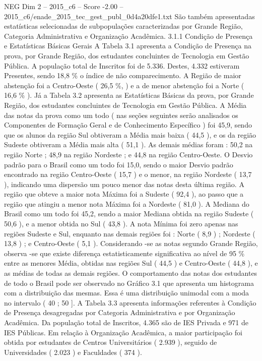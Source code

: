 \begin{textsample}{NEG Dim 2 – 2015\_c6 – Score -2.00 – 2015\_c6/enade\_2015\_tec\_gest\_publ\_0d4a20dfe1.txt}
São também apresentadas estatísticas selecionadas de subpopulações caracterizadas por Grande Região, Categoria Administrativa e Organização Acadêmica. 3.1.1 Condição de Presença e Estatísticas Básicas Gerais A Tabela 3.1 apresenta a Condição de Presença na prova, por Grande Região, dos estudantes concluintes de Tecnologia em Gestão Pública.
A população total de Inscritos foi de 5.336.
Destes, 4.332 estiveram Presentes, sendo 18,8 \% o índice de não comparecimento.
A Região de maior abstenção foi a Centro-Oeste ( 26,5 \%, ) e a de menor abstenção foi a Norte ( 16,6 \% ).
Já a Tabela 3.2 apresenta as Estatísticas Básicas da prova, por Grande Região, dos estudantes concluintes de Tecnologia em Gestão Pública.
A Média das notas da prova como um todo ( nas seções seguintes serão analisados os Componentes de Formação Geral e de Conhecimento Específico ) foi 45,9, sendo que os alunos da região Sul obtiveram a Média mais baixa ( 44,5 ), e os da região Sudeste obtiveram a Média mais alta ( 51,1 ).
As demais médias foram : 50,2 na região Norte ; 48,9 na região Nordeste ; e 44,8 na região Centro-Oeste.
O Desvio padrão para o Brasil como um todo foi 15,0, sendo o maior Desvio padrão encontrado na região Centro-Oeste ( 15,7 ) e o menor, na região Nordeste ( 13,7 ), indicando uma dispersão um pouco menor das notas desta última região.
A região que obteve a maior nota Máxima foi a Sudeste ( 92,4 ), ao passo que a região que atingiu a menor nota Máxima foi a Nordeste ( 81,0 ).
A Mediana do Brasil como um todo foi 45,2, sendo a maior Mediana obtida na região Sudeste ( 50,6 ), e a menor obtida no Sul ( 43,8 ).
A nota Mínima foi zero apenas nas regiões Sudeste e Sul, enquanto nas demais regiões foi : Norte ( 8,9 ) ; Nordeste ( 13,8 ) ; e Centro-Oeste ( 5,1 ).
Considerando -se as notas segundo Grande Região, observa -se que existe diferença estatisticamente significativa ao nível de 95 \% entre as menores Média, obtidas nas regiões Sul ( 44,5 ) e Centro-Oeste ( 44,8 ), e as médias de todas as demais regiões.
O comportamento das notas dos estudantes de todo o Brasil pode ser observado no Gráfico 3.1 que apresenta um histograma com a distribuição das mesmas.
Essa é uma distribuição unimodal com a moda no intervalo ( 40 ; 50 ].
A Tabela 3.3 apresenta informações referentes à Condição de Presença desagregadas por Categoria Administrativa e por Organização Acadêmica.
Da população total de Inscritos, 4.365 são de IES Privada e 971 de IES Públicas.
Em relação à Organização Acadêmica, a maior participação foi obtida por estudantes de Centros Universitários ( 2.939 ), seguido de Universidades ( 2.023 ) e Faculdades ( 374 ).

\end{textsample}
